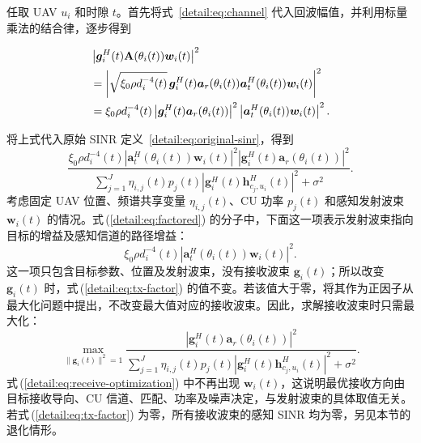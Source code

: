 \documentclass[11pt,a4paper]{ctexart}
\begin{document}
任取 UAV $u_i$ 和时隙 $t$。首先将式~\eqref{detail:eq:channel} 代入回波幅值，并利用标量乘法的结合律，逐步得到
\begin{samepage}
\begin{align}
&\left|\bm g_i^H(t)\mathbf A(\theta_i(t))\bm w_i(t)\right|^2\notag\\
&=\left|\sqrt{\xi_0\rho d_i^{-4}(t)}\,
\bm g_i^H(t)\bm a_r(\theta_i(t))\bm a_t^H(\theta_i(t))\bm w_i(t)\right|^2\notag\\
&=\xi_0\rho d_i^{-4}(t)
\left|\bm g_i^H(t)\bm a_r(\theta_i(t))\right|^2
\left|\bm a_t^H(\theta_i(t))\bm w_i(t)\right|^2.\label{detail:eq:factor}
\end{align}
\end{samepage}
将上式代入原始 SINR 定义~\eqref{detail:eq:original-sinr}，得到
\begin{equation}\label{detail:eq:factored}
\frac{\xi_0\rho d_i^{-4}(t)
\left|\bm a_t^H(\theta_i(t))\bm w_i(t)\right|^2
\left|\bm g_i^H(t)\bm a_r(\theta_i(t))\right|^2}
{\displaystyle\sum_{j=1}^J\eta_{i,j}(t)p_j(t)
\left|\bm g_i^H(t)\bm h_{c_j,u_i}^{H}(t)\right|^2+\sigma^2}.
\end{equation}
考虑固定 UAV 位置、频谱共享变量 $\eta_{i,j}(t)$、CU 功率 $p_j(t)$ 和感知发射波束 $\bm w_i(t)$ 的情况。式\,(\ref{detail:eq:factored}) 的分子中，下面这一项表示发射波束指向目标的增益及感知信道的路径增益：
\begin{equation}\label{detail:eq:tx-factor}
\xi_0\rho d_i^{-4}(t)
\left|\bm a_t^H(\theta_i(t))\bm w_i(t)\right|^2.
\end{equation}
这一项只包含目标参数、位置及发射波束，没有接收波束 $\bm g_i(t)$；所以改变 $\bm g_i(t)$ 时，式\,(\ref{detail:eq:tx-factor}) 的值不变。若该值大于零，将其作为正因子从最大化问题中提出，不改变最大值对应的接收波束。因此，求解接收波束时只需最大化：
\begin{equation}\label{detail:eq:receive-optimization}
\max_{\|\bm g_i(t)\|^2=1}
\frac{\left|\bm g_i^H(t)\bm a_r(\theta_i(t))\right|^2}
{\displaystyle\sum_{j=1}^J\eta_{i,j}(t)p_j(t)
\left|\bm g_i^H(t)\bm h_{c_j,u_i}^{H}(t)\right|^2+\sigma^2}.
\end{equation}
式\,(\ref{detail:eq:receive-optimization}) 中不再出现 $\bm w_i(t)$，这说明最优接收方向由目标接收导向、CU 信道、匹配、功率及噪声决定，与发射波束的具体取值无关。若式\,(\ref{detail:eq:tx-factor}) 为零，所有接收波束的感知 SINR 均为零，另见本节的退化情形。
\end{document}
